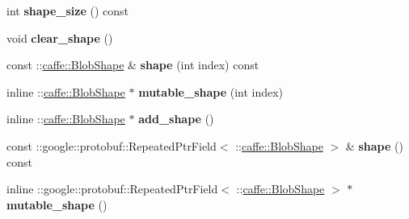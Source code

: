 \begin{DoxyCompactItemize}
\mbox{\label{classcaffe_1_1_input_parameter_aa402fdd2a0b23c8c2f9a8300e22b4acb}} 
int {\bfseries shape\+\_\+size} () const
\item 
\mbox{\label{classcaffe_1_1_input_parameter_af93240bd27b377ea14b91f7531b5f5fa}} 
void {\bfseries clear\+\_\+shape} ()
\item 
\mbox{\label{classcaffe_1_1_input_parameter_aed05c392ccd11d4c618a72c57e07d6b3}} 
const \+::\mbox{\hyperlink{classcaffe_1_1_blob_shape}{caffe\+::\+Blob\+Shape}} \& {\bfseries shape} (int index) const
\item 
\mbox{\label{classcaffe_1_1_input_parameter_a133e5dba28d2e585e3fbb78b916950cd}} 
inline \+::\mbox{\hyperlink{classcaffe_1_1_blob_shape}{caffe\+::\+Blob\+Shape}} $\ast$ {\bfseries mutable\+\_\+shape} (int index)
\item 
\mbox{\label{classcaffe_1_1_input_parameter_a3925563c89ad736bfd4aeaa29dc598f6}} 
inline \+::\mbox{\hyperlink{classcaffe_1_1_blob_shape}{caffe\+::\+Blob\+Shape}} $\ast$ {\bfseries add\+\_\+shape} ()
\item 
\mbox{\label{classcaffe_1_1_input_parameter_a3d881dae4ebc08b3ea6dc42748350ef2}} 
const \+::google\+::protobuf\+::\+Repeated\+Ptr\+Field$<$ \+::\mbox{\hyperlink{classcaffe_1_1_blob_shape}{caffe\+::\+Blob\+Shape}} $>$ \& {\bfseries shape} () const
\item 
\mbox{\label{classcaffe_1_1_input_parameter_a9d66a3ea526ba1c2d641f4b6635b2dc8}} 
inline \+::google\+::protobuf\+::\+Repeated\+Ptr\+Field$<$ \+::\mbox{\hyperlink{classcaffe_1_1_blob_shape}{caffe\+::\+Blob\+Shape}} $>$ $\ast$ {\bfseries mutable\+\_\+shape} ()
\end{DoxyCompactItemize}
